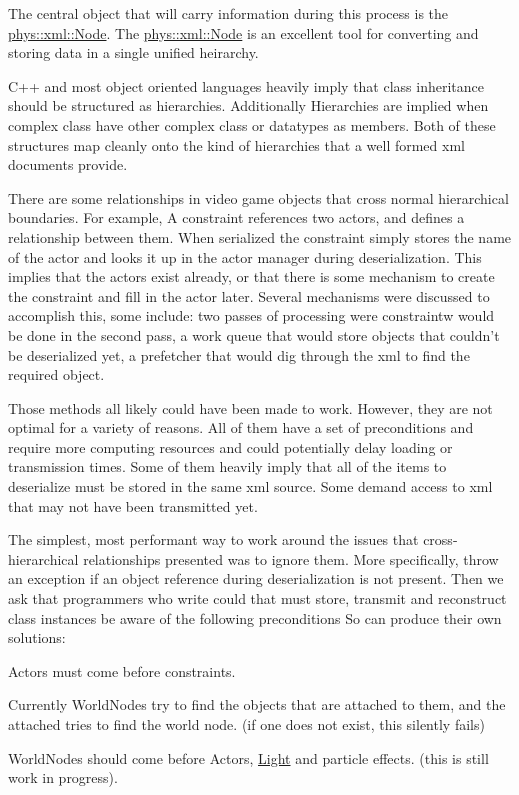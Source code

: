 The central object that will carry information during this process is the \hyperlink{classphys_1_1xml_1_1Node}{phys::xml::Node}. The \hyperlink{classphys_1_1xml_1_1Node}{phys::xml::Node} is an excellent tool for converting and storing data in a single unified heirarchy. \par
 \par
 C++ and most object oriented languages heavily imply that class inheritance should be structured as hierarchies. Additionally Hierarchies are implied when complex class have other complex class or datatypes as members. Both of these structures map cleanly onto the kind of hierarchies that a well formed xml documents provide. \par
 \par
 There are some relationships in video game objects that cross normal hierarchical boundaries. For example, A constraint references two actors, and defines a relationship between them. When serialized the constraint simply stores the name of the actor and looks it up in the actor manager during deserialization. This implies that the actors exist already, or that there is some mechanism to create the constraint and fill in the actor later. Several mechanisms were discussed to accomplish this, some include: two passes of processing were constraintw would be done in the second pass, a work queue that would store objects that couldn't be deserialized yet, a prefetcher that would dig through the xml to find the required object. \par
 \par
 Those methods all likely could have been made to work. However, they are not optimal for a variety of reasons. All of them have a set of preconditions and require more computing resources and could potentially delay loading or transmission times. Some of them heavily imply that all of the items to deserialize must be stored in the same xml source. Some demand access to xml that may not have been transmitted yet. \par
 \par
 The simplest, most performant way to work around the issues that cross-\/hierarchical relationships presented was to ignore them. More specifically, throw an exception if an object reference during deserialization is not present. Then we ask that programmers who write could that must store, transmit and reconstruct class instances be aware of the following preconditions So can produce their own solutions:
\begin{DoxyItemize}
\item Actors must come before constraints.
\item Currently WorldNodes try to find the objects that are attached to them, and the attached tries to find the world node. (if one does not exist, this silently fails)
\item WorldNodes should come before Actors, \hyperlink{classphys_1_1Light}{Light} and particle effects. (this is still work in progress).
\end{DoxyItemize}

